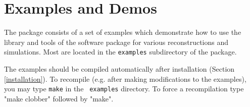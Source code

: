 \documentclass[]{nadia}
\begin{document}
\newpage

\section{Examples and Demos}

The package consists of a set of examples which demonstrate how to use
the library and tools of the software package for various
reconstructions and simulations. Most are located in the {\tt examples}
subdirectory of the package.

The examples should be compiled automatically after installation
(Section \ref{installation}). To recompile (e.g.  after making
modifications to the examples), you may type {\tt make} in the {\tt
  examples} directory.  To force a recompilation type "make clobber"
followed by "make".
\end{document}

